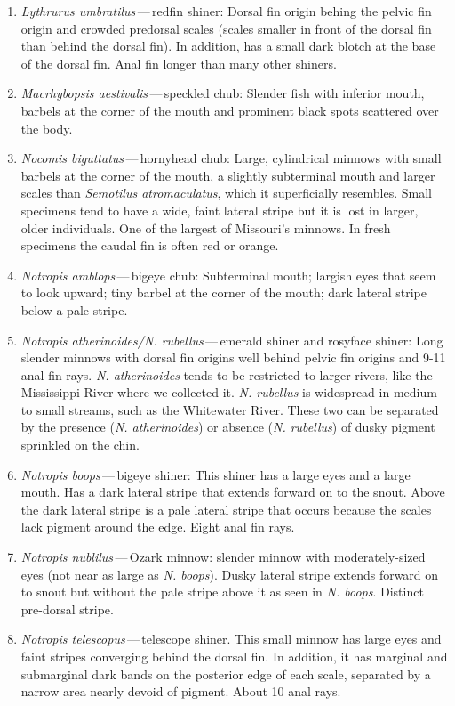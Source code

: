 \documentclass[11pt]{article}
\begin{document}
\begin{enumerate}
\item \textit{Lythrurus umbratilus}\,—\,redfin shiner:  Dorsal fin origin behing the pelvic fin origin and crowded predorsal scales (scales smaller in front of the dorsal fin than behind the dorsal fin).  In addition, has a small dark blotch at the base of the dorsal fin. Anal fin longer than many other shiners.
\item \textit{Macrhybopsis aestivalis}\,—\,speckled chub: Slender fish with inferior mouth, barbels at the corner of the mouth and prominent black spots scattered over the body.
\item \textit{Nocomis biguttatus}\,—\,hornyhead chub: Large, cylindrical minnows with small barbels at the corner of the mouth, a slightly subterminal mouth and larger scales than \textit{Semotilus atromaculatus}, which it superficially resembles. Small specimens tend to have a wide, faint lateral stripe but it is lost in larger, older individuals.  One of the largest of Missouri’s minnows. In fresh specimens the caudal fin is often red or orange.
\item \textit{Notropis amblops}\,—\,bigeye chub: Subterminal mouth; largish eyes that seem to look upward; tiny barbel at the corner of the mouth; dark lateral stripe below a pale stripe.
\item \textit{Notropis atherinoides/N. rubellus}\,—\,emerald shiner and rosyface shiner: Long slender minnows with dorsal fin origins well behind pelvic fin origins and 9-11 anal fin rays. \textit{N. atherinoides} tends to be restricted to larger rivers, like the Mississippi River where we collected it. \textit{N. rubellus} is widespread in medium to small streams, such as the Whitewater River.  These two can be separated by the presence (\textit{N. atherinoides}) or absence (\textit{N. rubellus}) of dusky pigment sprinkled on the chin. 
\item \textit{Notropis boops}\,—\,bigeye shiner: This shiner has a large eyes and a large mouth. Has a dark lateral stripe that extends forward on to the snout. Above the dark lateral stripe is a pale lateral stripe that occurs because the scales lack pigment around the edge. Eight anal fin rays.
\item \textit{Notropis nublilus}\,—\,Ozark minnow: slender minnow with moderately-sized eyes (not near as large as \textit{N. boops}). Dusky lateral stripe extends forward on to snout but without the pale stripe above it as seen in \textit{N. boops}.  Distinct pre-dorsal stripe.
\item \textit{Notropis telescopus}\,—\,telescope shiner.  This small minnow has large eyes and faint stripes converging behind the dorsal fin.  In addition, it has marginal and submarginal dark bands on the posterior edge of each scale, separated by a narrow area nearly devoid of pigment.  About 10 anal rays. 

\end{enumerate}
\end{document}

